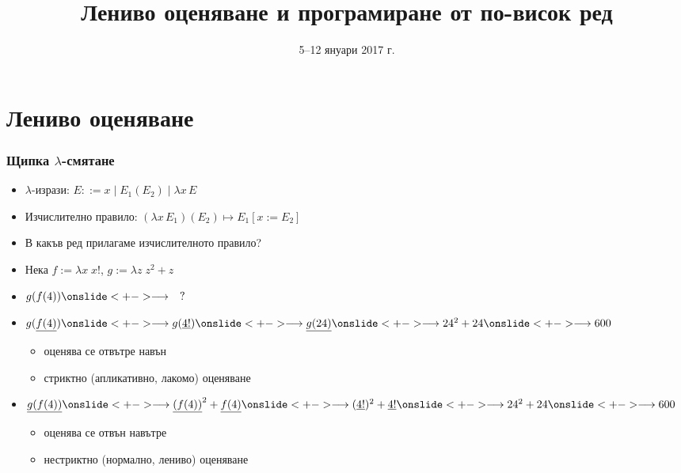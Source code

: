 \documentclass{beamer}
\title[Лениво оценяване]{Лениво оценяване и програмиране от по-висок ред}
\date{5--12 януари 2017 г.}
\newcommand{\lra}{\onslide<+->$\longrightarrow$\xspace}
\begin{document}
\begin{frame}
  \titlepage
\end{frame}

\section{Лениво оценяване}

\begin{frame}
  \frametitle{Щипка $\lambda$-смятане}

  \renewcommand{\lra}{\onslide<+->\longrightarrow\xspace}
  \begin{itemize}[<+->]
  \item $\lambda$-изрази: $E ::= x \;|\; E_1(E_2) \;|\; \lambda x\, E$
  \item Изчислително правило: $(\lambda x\,E_1)(E_2) \mapsto E_1[x := E_2]$
  \item В какъв ред прилагаме изчислителното правило?
  \item Нека $f := \lambda x\; x!$, $g := \lambda z\;z^2+z$
  \item $g(f(4)) \lra \quad ?$
  \item $g(\underline{f(4)})
    \lra g(\underline{4!})
    \lra \underline{g(24)}
    \lra 24^2 + 24
    \lra 600$
    \begin{itemize}
    \item<16-> оценява се \alert{отвътре навън}
    \item<17-> \alert{стриктно} (апликативно, лакомо) оценяване
    \end{itemize}
  \item $\underline{g(f(4))}
    \lra \underline{(f(4))}^2 + \underline{f(4)}
    \lra (\underline{4!})^2 + \underline{4!}
    \lra 24^2 + 24
    \lra 600$
    \begin{itemize}
    \item<16-> оценява се \alert{отвън навътре}
    \item<17-> \alert{нестриктно} (нормално, лениво) оценяване
    \end{itemize}
  \end{itemize}
\end{frame}
\end{document}

